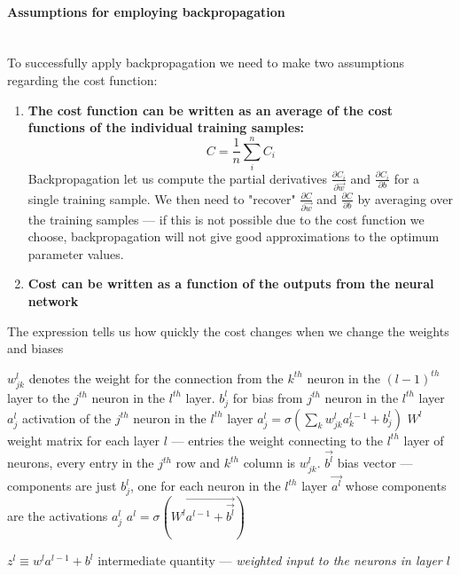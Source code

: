 \documentclass[10pt, a4paper, twocolumn]{article}
\newcommand{\myparagraph}[1]{\paragraph{#1}\mbox{}\\}
\begin{document}
			\myparagraph{Assumptions for employing backpropagation}
			To successfully apply backpropagation we need to make two assumptions regarding the cost function:
			\begin{enumerate}
				\item \textbf{The cost function can be written as an average of the cost functions of the individual training samples:} 
				$$C = \frac{1}{n}\sum_i^n C_i$$
				Backpropagation let us compute the partial derivatives $\frac{\partial C_i}{\partial \vec{w}}$ and $\frac{\partial C_i}{\partial b}$ for a single training sample. We then need to "recover" $\frac{\partial C}{\partial \vec{w}}$ and $\frac{\partial C}{\partial b}$ by averaging over the training samples --- if this is not possible due to the cost function we choose, backpropagation will not give good approximations to the optimum parameter values.
				\item \textbf{Cost can be written as a function of the outputs from the neural network}
			\end{enumerate}	
			
			
			The expression tells us how quickly the cost changes when we change the weights and biases
			
			$w_{jk}^l$ denotes the weight for the connection from the $k^{th}$ neuron in the $(l-1)^{th}$ layer to the $j^{th}$ neuron in the $l^{th}$ layer.
			$b^l_j$ for bias from $j^{th}$ neuron in the $l^{th}$ layer
			$a^l_j$ activation of the $j^{th}$ neuron in the $l^{th}$ layer
			$a_j^l=\sigma\left(\sum_k w_{jk}^l a_k^{l-1} + b^l_j\right)$
			$W^l$ weight matrix for each layer $l$ --- entries the weight connecting to the $l^{th}$ layer of neurons, every entry in the $j^{th}$ row and $k^{th}$ column is $w^l_{jk}$.
			$\vec{b^l}$ bias vector --- components are just $b^l_j$, one for each neuron in the $l^{th}$ layer
			$\vec{a^l}$ whose components are the activations $a^l_j$
			$a^l=\sigma(W^l\vec{a^{l-1}+\vec{b^l}})$
			
			$z^l\equiv w^l a^{l-1} + b^l$ intermediate quantity --- \emph{weighted input to the neurons in layer $l$}
			
\end{document}
